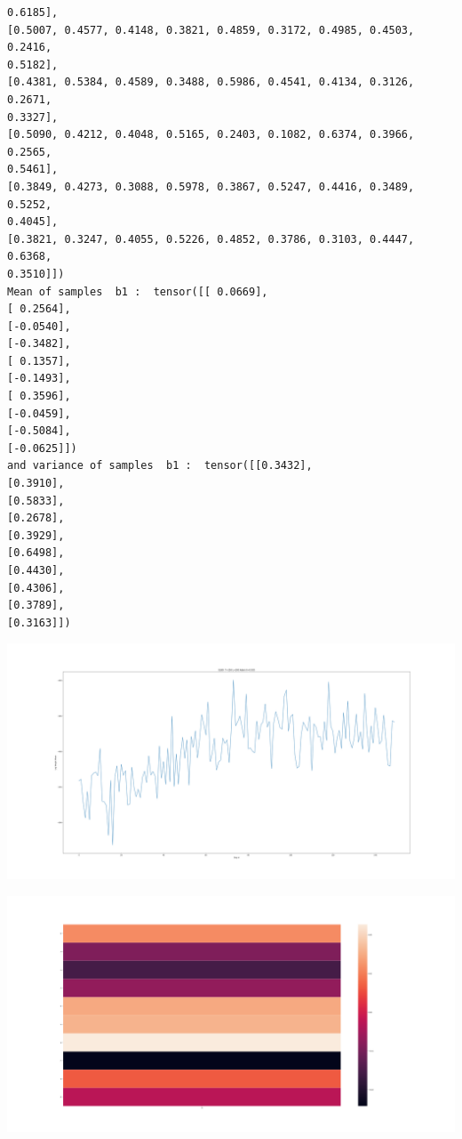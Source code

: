 \documentclass[]{article}
\begin{document}
\begin{verbatim}
0.6185],
[0.5007, 0.4577, 0.4148, 0.3821, 0.4859, 0.3172, 0.4985, 0.4503, 0.2416,
0.5182],
[0.4381, 0.5384, 0.4589, 0.3488, 0.5986, 0.4541, 0.4134, 0.3126, 0.2671,
0.3327],
[0.5090, 0.4212, 0.4048, 0.5165, 0.2403, 0.1082, 0.6374, 0.3966, 0.2565,
0.5461],
[0.3849, 0.4273, 0.3088, 0.5978, 0.3867, 0.5247, 0.4416, 0.3489, 0.5252,
0.4045],
[0.3821, 0.3247, 0.4055, 0.5226, 0.4852, 0.3786, 0.3103, 0.4447, 0.6368,
0.3510]])
Mean of samples  b1 :  tensor([[ 0.0669],
[ 0.2564],
[-0.0540],
[-0.3482],
[ 0.1357],
[-0.1493],
[ 0.3596],
[-0.0459],
[-0.5084],
[-0.0625]])
and variance of samples  b1 :  tensor([[0.3432],
[0.3910],
[0.5833],
[0.2678],
[0.3929],
[0.6498],
[0.4430],
[0.4306],
[0.3789],
[0.3163]])
\end{verbatim}
\begin{center}
	\includegraphics[width=\linewidth]{Figures/elbo_4Adam.png}
\end{center}
\begin{center}
	\includegraphics[width=\linewidth]{Figures/W0.png}
\end{center}
\end{document}
